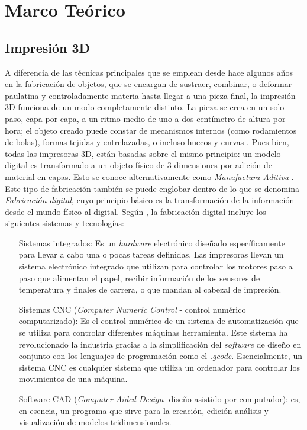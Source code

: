 
\chapter{Marco Te\'orico}
\label{cap:preliminares}

\section{Impresión 3D}

 A diferencia de las técnicas principales que se emplean desde hace algunos años en la fabricación de objetos, que se encargan de sustraer, combinar, o deformar paulatina y controladamente materia hasta llegar a una pieza final, la impresión 3D funciona de un modo completamente distinto. La pieza se crea en un solo paso, capa por capa, a un ritmo medio de uno a dos centímetro de altura por hora; el objeto creado puede constar de mecanismos internos (como rodamientos de bolas), formas tejidas y entrelazadas, o incluso huecos y curvas \citep{Berchon2014}. Pues bien, todas las impresoras 3D, están basadas sobre el mismo principio: un modelo digital es transformado a un objeto físico de 3 dimensiones por adición de material en capas. Esto se conoce alternativamente como \textit{Manufactura Aditiva} \citep{3dhub2018}. Este tipo de fabricación también se puede englobar dentro de lo que se denomina \textit{Fabricación digital}, cuyo principio básico es la transformación de la información  desde el mundo físico al digital. Según \citep{jorquera2016}, la fabricación digital incluye los siguientes sistemas y tecnologías:
 
 \begin{itemize}
	
	\item[Sistemas integrados:] Es un \textit{hardware} electrónico diseñado específicamente para llevar a cabo una o pocas tareas definidas. Las impresoras llevan un sistema electrónico integrado que utilizan para controlar los motores paso a paso que alimentan el papel, recibir información de los sensores de temperatura y finales de carrera, o que mandan al cabezal de impresión.
	\item[Sistemas CNC (\textit{Computer Numeric Control} - control numérico computarizado):] Es el control numérico de un sistema de automatización que se utiliza para controlar diferentes máquinas herramienta. Este sistema ha revolucionado la industria gracias a la simplificación del \textit{software} de diseño en conjunto con los lenguajes de programación como el \textit{.gcode}. Esencialmente, un sistema CNC es cualquier sistema que utiliza un ordenador para controlar los movimientos de una máquina.
	\item[Software CAD (\textit{Computer Aided Design}- diseño asistido por computador):] es, en esencia, un programa que sirve para la creación, edición análisis y visualización de modelos tridimensionales.  
	
 
 \end{itemize}

